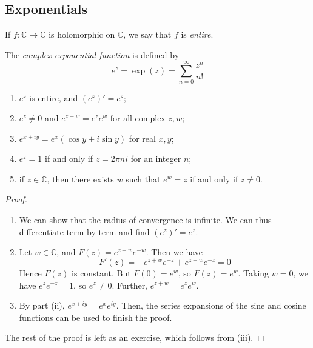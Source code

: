 \subsection{Exponentials}
\begin{definition}
	If \( f \colon \mathbb C \to \mathbb C \) is holomorphic on \( \mathbb C \), we say that \( f \) is \textit{entire}.
\end{definition}
\begin{definition}
	The \textit{complex exponential function} is defined by
	\[
		e^z = \exp(z) = \sum_{n=0}^\infty \frac{z^n}{n!}
	\]
\end{definition}
\begin{proposition}
	\begin{enumerate}
		\item \( e^z \) is entire, and \( (e^z)' = e^z \);
		\item \( e^z \neq 0 \) and \( e^{z+w} = e^z e^w \) for all complex \( z, w \);
		\item \( e^{x+iy} = e^x(\cos y + i \sin y) \) for real \( x, y \);
		\item \( e^z = 1 \) if and only if \( z = 2 \pi n i \) for an integer \( n \);
		\item if \( z \in \mathbb C \), then there exists \( w \) such that \( e^w = z \) if and only if \( z \neq 0 \).
	\end{enumerate}
\end{proposition}
\begin{proof}
	\begin{enumerate}
		\item We can show that the radius of convergence is infinite.
		      We can thus differentiate term by term and find \( (e^z)' = e^z \).
		\item Let \( w \in \mathbb C \), and \( F(z) = e^{z+w} e^{-w} \).
		      Then we have
		      \[
			      F'(z) = -e^{z+w} e^{-z} + e^{z+w} e^{-z} = 0
		      \]
		      Hence \( F(z) \) is constant.
		      But \( F(0) = e^w \), so \( F(z) = e^w \).
		      Taking \( w = 0 \), we have \( e^z e^{-z} = 1 \), so \( e^z \neq 0 \).
		      Further, \( e^{z+w} = e^z e^w \).
		\item By part (ii), \( e^{x+iy} = e^x e^{iy} \).
		      Then, the series expansions of the sine and cosine functions can be used to finish the proof.
	\end{enumerate}
	The rest of the proof is left as an exercise, which follows from (iii).
\end{proof}

